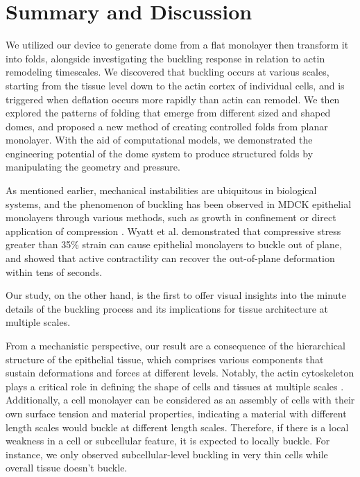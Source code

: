 \hypertarget{summary-and-discussion-1}{%
	\section{Summary and Discussion}\label{summary-and-discussion-1}}

We utilized our device to generate dome from a flat monolayer then transform it into folds, alongside investigating the buckling response in relation to actin remodeling timescales. We discovered that buckling occurs at various scales, starting from the tissue level down to the actin cortex of individual cells, and is triggered when deflation occurs more rapidly than actin can remodel. We then explored the patterns of folding that emerge from different sized and shaped domes, and proposed a new method of creating controlled folds from planar monolayer. With the aid of computational models, we demonstrated the engineering potential of the dome system to produce structured folds by manipulating the geometry and pressure.

As mentioned earlier, mechanical instabilities are ubiquitous in biological systems, and the phenomenon of buckling has been observed in MDCK epithelial monolayers through various methods, such as growth in confinement or direct application of compression \cite{wyatt2020,trushko2020}. Wyatt et al. demonstrated that compressive stress greater than 35\% strain can cause epithelial monolayers to buckle out of plane, and showed that active contractility can recover the out-of-plane deformation within tens of seconds.

Our study, on the other hand, is the first to offer visual insights into the minute details of the buckling process and its implications for tissue architecture at multiple scales.

From a mechanistic perspective, our result are a consequence of the hierarchical structure of the epithelial tissue, which comprises various components that sustain deformations and forces at different levels. Notably, the actin cytoskeleton plays a critical role in defining the shape of cells and tissues at multiple scales  \cite{clarke2021}. Additionally, a cell monolayer can be considered as an assembly of cells with their own surface tension and material properties, indicating a material with different length scales would buckle at different length scales. Therefore, if there is a local weakness in a cell or subcellular feature, it is expected to locally buckle. For instance, we only observed subcellular-level buckling in very thin cells while overall tissue doesn't buckle.

